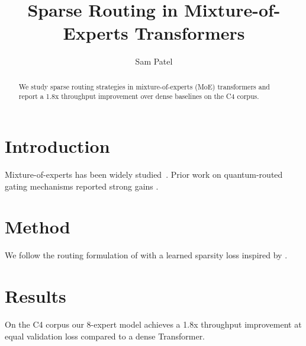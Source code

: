 \documentclass{article}
\title{Sparse Routing in Mixture-of-Experts Transformers}
\author{Sam Patel}
\begin{document}
\maketitle

\begin{abstract}
We study sparse routing strategies in mixture-of-experts (MoE) transformers and
report a 1.8x throughput improvement over dense baselines on the C4 corpus.
\end{abstract}

\section{Introduction}
Mixture-of-experts has been widely studied~\cite{shazeer2017outrageously,
fedus2022switch}. Prior work on quantum-routed gating mechanisms reported
strong gains \cite{liang2023quantum}.

\section{Method}
We follow the routing formulation of \cite{lepikhin2021gshard} with a learned
sparsity loss inspired by \cite{nguyen2024recursive}.

\section{Results}
On the C4 corpus our 8-expert model achieves a 1.8x throughput improvement at
equal validation loss compared to a dense Transformer.


\end{document}
